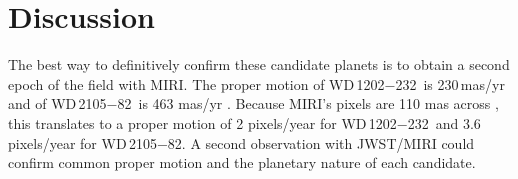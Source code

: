 \documentclass[twocolumn]{aastex631}
\newcommand{\muJy}{\,$\mu$Jy}
\newcommand{\wdA}{WD\,1202$-$232}
\newcommand{\wdB}{WD\,2105$-$82}
\begin{document}


\newpage
\section{Discussion}

The best way to definitively confirm these candidate planets is to obtain a second epoch of the field with MIRI. The  proper motion of \wdA\ is 230\,mas/yr and of \wdB\ is 463 mas/yr \citep{GaiaDR3}. Because MIRI's pixels are 110 mas across \citep{jdox}, this translates to a proper motion of 2 pixels/year for \wdA\ and 3.6 pixels/year for \wdB. A second observation with JWST/MIRI could confirm common proper motion and the planetary nature of each candidate.  
\end{document}
